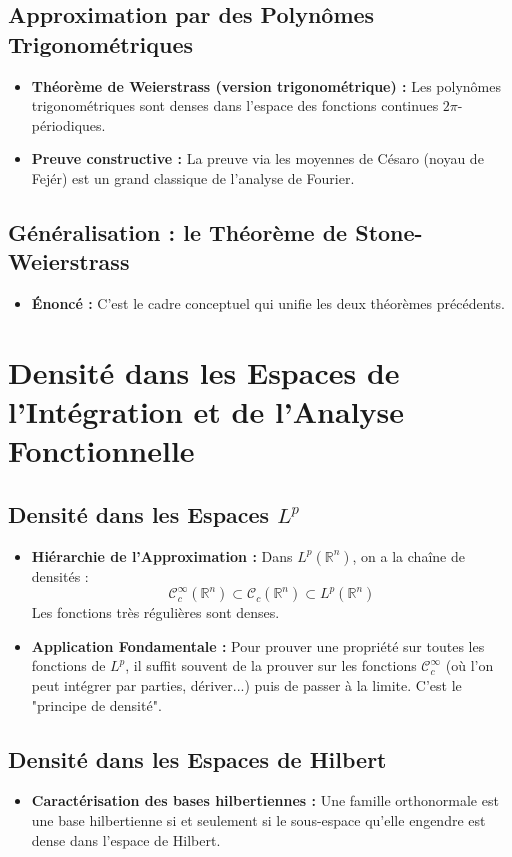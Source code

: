 \documentclass[12pt, a4paper, parskip=full]{report}
\theoremstyle{agregstyle}
\begin{document}
\subsection{Approximation par des Polynômes Trigonométriques}
\begin{itemize}
    \item \textbf{Théorème de Weierstrass (version trigonométrique) :} Les polynômes trigonométriques sont denses dans l'espace des fonctions continues $2\pi$-périodiques.
    \item \textbf{Preuve constructive :} La preuve via les moyennes de Césaro (noyau de Fejér) est un grand classique de l'analyse de Fourier.
\end{itemize}

\subsection{Généralisation : le Théorème de Stone-Weierstrass}
\begin{itemize}
    \item \textbf{Énoncé :} C'est le cadre conceptuel qui unifie les deux théorèmes précédents.
\end{itemize}

\section{Densité dans les Espaces de l'Intégration et de l'Analyse Fonctionnelle}

\subsection{Densité dans les Espaces $L^p$}
\begin{itemize}
    \item \textbf{Hiérarchie de l'Approximation :} Dans $L^p(\mathbb{R}^n)$, on a la chaîne de densités :
    $$ \mathcal{C}_c^\infty(\mathbb{R}^n) \subset \mathcal{C}_c(\mathbb{R}^n) \subset L^p(\mathbb{R}^n) $$
    Les fonctions très régulières sont denses.
    \item \textbf{Application Fondamentale :} Pour prouver une propriété sur toutes les fonctions de $L^p$, il suffit souvent de la prouver sur les fonctions $\mathcal{C}_c^\infty$ (où l'on peut intégrer par parties, dériver...) puis de passer à la limite. C'est le "principe de densité".
\end{itemize}

\subsection{Densité dans les Espaces de Hilbert}
\begin{itemize}
    \item \textbf{Caractérisation des bases hilbertiennes :} Une famille orthonormale est une base hilbertienne si et seulement si le sous-espace qu'elle engendre est dense dans l'espace de Hilbert.
\end{itemize}
\end{document}
